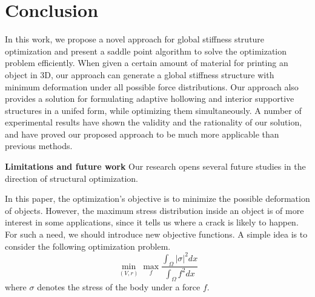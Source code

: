 \section{Conclusion}
\label{sec:conclusion}

In this work, we propose a novel approach for global stiffness struture optimization and present a saddle point algorithm to solve the optimization problem efficiently.
%
When given a certain amount of material for printing an object in 3D, our approach can generate a global stiffness structure with minimum deformation under all possible force distributions.
%
Our approach also provides a solution for formulating adaptive hollowing and interior supportive structures in a unifed form, while optimizing them simultaneously.
%
A number of experimental results have shown the validity and the rationality of our solution,
and have proved our proposed approach to be much more applicable than previous methods.
%


\noindent\textbf{Limitations and future work}
Our research opens several future studies in the direction of structural optimization.

In this paper, the optimization's objective is to minimize the possible deformation of objects.
However, the maximum stress distribution inside an object is of more interest in some applications, since it tells us where a crack is likely to happen. For such a need, we should introduce new objective functions. A simple idea is to consider the following optimization problem.
$$
\min_{(V,r)}\max_{f} \frac{\int_{\Omega} |\sigma|^2 dx}{\int_\Omega f^2dx}
$$
where $\sigma$ denotes the stress of the body under a force $f$.




%
%
%

